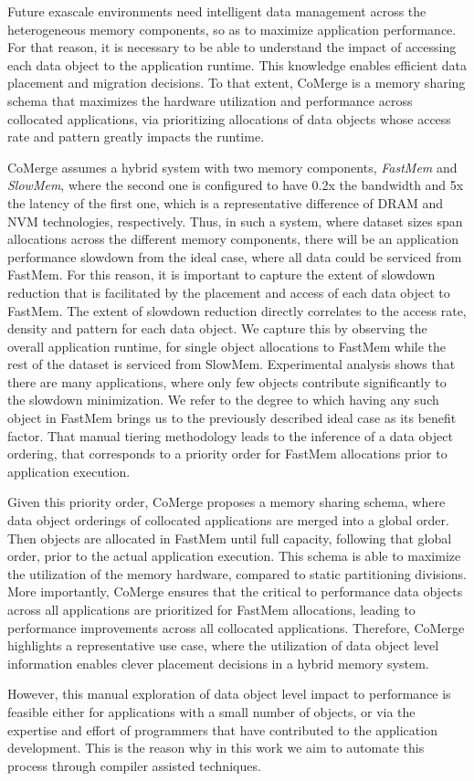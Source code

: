 Future exascale environments need intelligent data management across the heterogeneous memory components, so as to maximize application performance.
For that reason, it is necessary to be able to understand the impact of accessing each data object to the application runtime.
This knowledge enables efficient data placement and migration decisions.
To that extent, CoMerge \cite{Doudali:2017:CTE:3132402.3132418} is a memory sharing schema that maximizes the hardware utilization and performance across collocated applications, via prioritizing allocations of data objects whose access rate and pattern greatly impacts the runtime.
 
CoMerge assumes a hybrid system with two memory components, \textit{FastMem} and \textit{SlowMem}, where the second one is configured to have 0.2x the bandwidth and 5x the latency of the first one, which is a representative difference of DRAM and \ac{NVM} technologies, respectively.
Thus, in such a system, where dataset sizes span allocations across the different memory  components, there will be an application performance slowdown from the ideal case, where all data could be serviced from FastMem.
For this reason, it is important to capture the extent of slowdown reduction that is facilitated by the placement and access of each data object to FastMem.
The extent of slowdown reduction directly correlates to the access rate, density and pattern for each data object.
We capture this  by observing the overall application runtime, for single object allocations to FastMem while the rest of the dataset is serviced from SlowMem.
Experimental analysis shows that there are many applications, where only few objects contribute significantly to the slowdown minimization.
We refer to the degree to which having any such object in FastMem brings us to the previously described ideal case as its benefit factor.
That manual tiering methodology leads to the inference of a data object ordering, that corresponds to a priority order for FastMem allocations prior to application execution.

Given this priority order, CoMerge proposes a memory sharing schema, where data object orderings of collocated applications are merged into a global order.
Then objects are allocated in FastMem until full capacity, following that global order, prior to the actual application execution.
This schema is able to maximize the utilization of the memory hardware, compared to static partitioning divisions.
More importantly, CoMerge ensures that  the critical to performance data objects across all applications are prioritized for FastMem allocations, leading to performance improvements across all collocated applications.
Therefore, CoMerge highlights a representative use case, where the utilization of data object level information enables clever placement decisions in a hybrid memory system.

However, this manual exploration of data object level impact to performance is feasible either for applications with a small number of objects, or via the expertise and effort of programmers that have contributed to the application development.
This is the reason why in this work we aim to automate this process through compiler assisted techniques.

